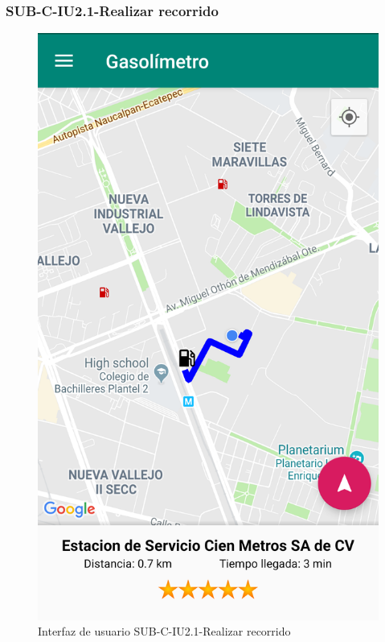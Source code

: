 \subsubsection{SUB-C-IU2.1-Realizar recorrido}\label{SUB-C-IU2.1}
\begin{figure}[H]
	\centering
	\includegraphics[scale=.28]{Capitulo4/software/submodulos/clasificacion/images/sub-c-iu2_1}
	\caption{Interfaz de usuario SUB-C-IU2.1-Realizar recorrido}
	\label{fig:sub-c-iu2.1}
\end{figure}